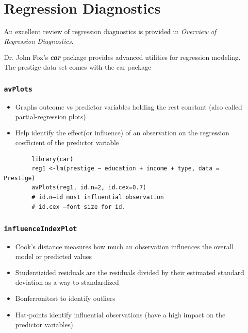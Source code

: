 \documentclass[residuals.tex]{subfiles}
\begin{document}
	
	\section{Regression Diagnostics}
	
	An excellent review of regression diagnostics is provided in  \textit{Overview of Regression Diagnostics}. 
	
	Dr. John Fox's \textbf{\textit{car}} package provides advanced utilities for regression modeling. The prestige data set comes with the car package
	
	\subsubsection*{\texttt{avPlots}}
	\begin{itemize}
		\item Graphs outcome vs predictor variables holding the rest constant (also called partial-regression plots)
		\item  Help identify the effect(or influence) of an observation on the regression coefficient of the predictor variable
	\end{itemize}
	\begin{framed}
		\begin{verbatim}
		library(car)
		reg1 <-lm(prestige ~ education + income + type, data = Prestige)
		avPlots(reg1, id.n=2, id.cex=0.7)
		# id.n–id most influential observation
		# id.cex –font size for id.
		\end{verbatim}
	\end{framed}
	\subsubsection*{\texttt{influenceIndexPlot}}
	\begin{itemize}
		\item Cook's distance measures how much an observation influences the overall model or predicted values
		\item  Studentizided residuals are the residuals divided by their estimated standard deviation as a way to standardized
		\item  Bonferronitest to identify outliers
		\item Hat-points identify influential observations (have a high impact on the predictor variables)
	\end{itemize}
	
\end{document}

